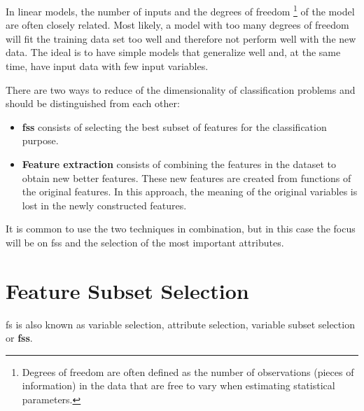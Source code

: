 In linear models, the number of inputs and the degrees of freedom \footnote{Degrees of freedom are often defined as the number of observations (pieces of information) in the data that are free to vary when estimating statistical parameters.} of the model are often closely related. Most likely, a model with too many degrees of freedom will fit the training data set too well and therefore not perform well with the new data. The ideal is to have simple models that generalize well and, at the same time, have input data with few input variables.

There are two ways to reduce of the dimensionality of classification problems and should be distinguished from each other: 

\begin{itemize}
    \item \textbf{\acrfull{fss}} \cite{GuyonElisseeff2003} consists of selecting the best subset of features for the classification purpose.

    \item \textbf{Feature extraction} \cite{liu1998feature} consists of combining the features in the dataset to obtain new better features. These new features are created from functions of the original features. In this approach, the meaning of the original variables is lost in the newly constructed features.
\end{itemize}

It is common to use the two techniques in combination, but in this case the focus will be on \acrlong{fss} and the selection of the most important attributes.

\section{Feature Subset Selection}
\label{sec:fss}

\acrlong{fs} is also known as variable selection, attribute selection, variable subset selection or \textbf{\acrfull{fss}}.

